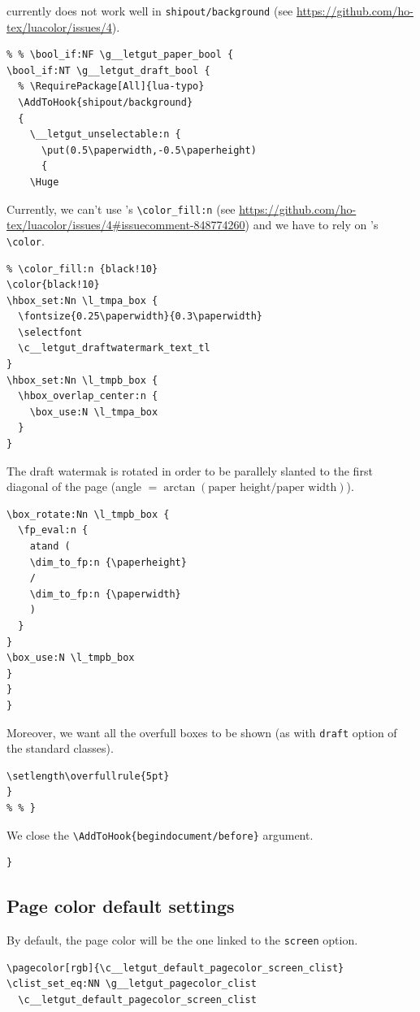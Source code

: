 \documentclass{letgut}
\begin{document}
\begin{itemize}
\begin{itemize}
currently does not work well in \lstinline+shipout/background+ (see
\url{https://github.com/ho-tex/luacolor/issues/4}).
\begin{lstlisting}
% % \bool_if:NF \g__letgut_paper_bool {
\bool_if:NT \g__letgut_draft_bool {
  % \RequirePackage[All]{lua-typo}
  \AddToHook{shipout/background}
  {
    \__letgut_unselectable:n {
      \put(0.5\paperwidth,-0.5\paperheight)
      {
	\Huge
\end{lstlisting}
Currently, we can't use 's \lstinline+\color_fill:n+ (see
\url{https://github.com/ho-tex/luacolor/issues/4\#issuecomment-848774260})
and we have to rely on 's \lstinline+\color+.
\begin{lstlisting}
% \color_fill:n {black!10}
\color{black!10}
\hbox_set:Nn \l_tmpa_box {
  \fontsize{0.25\paperwidth}{0.3\paperwidth}
  \selectfont
  \c__letgut_draftwatermark_text_tl
}
\hbox_set:Nn \l_tmpb_box {
  \hbox_overlap_center:n {
    \box_use:N \l_tmpa_box
  }
}
\end{lstlisting}
The draft watermak is rotated in order to be parallely slanted to the first
diagonal of the page (angle \(=\arctan(\text{paper height}/\text{paper
    width})\)).
\begin{lstlisting}
\box_rotate:Nn \l_tmpb_box {
  \fp_eval:n {
    atand (
    \dim_to_fp:n {\paperheight}
    /
    \dim_to_fp:n {\paperwidth}
    )
  }
}
\box_use:N \l_tmpb_box
}
}
}
\end{lstlisting}
	    Moreover, we want all the overfull boxes to be shown (as with
\lstinline+draft+ option of the standard classes).
\begin{lstlisting}
\setlength\overfullrule{5pt}
}
% % }
\end{lstlisting}
\end{itemize}
\end{itemize}

We close the \lstinline+\AddToHook{begindocument/before}+ argument.

\begin{lstlisting}
}
\end{lstlisting}

\subsection{Page color default settings}
\label{sec:orgbdbe3de}

By default, the page color will be the one linked to the \lstinline+screen+ option.

\begin{lstlisting}
\pagecolor[rgb]{\c__letgut_default_pagecolor_screen_clist}
\clist_set_eq:NN \g__letgut_pagecolor_clist
  \c__letgut_default_pagecolor_screen_clist
\end{lstlisting}
\end{document}
